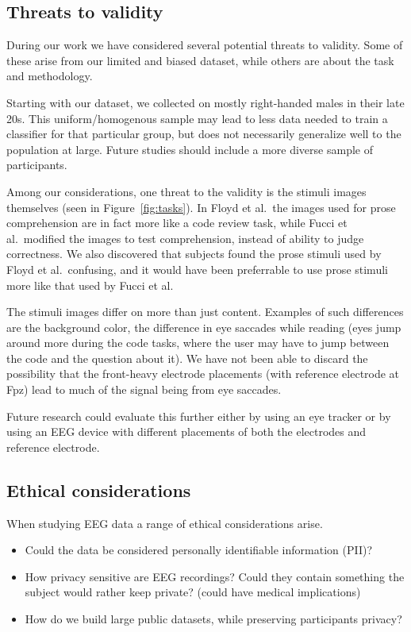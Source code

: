 \subsection{Threats to validity}

    During our work we have considered several potential threats to validity. Some of these arise from our limited and biased dataset, while others are about the task and methodology.

    Starting with our dataset, we collected on mostly right-handed males in their late 20s. This uniform/homogenous sample may lead to less data needed to train a classifier for that particular group, but does not necessarily generalize well to the population at large. Future studies should include a more diverse sample of participants.

    Among our considerations, one threat to the validity is the stimuli images themselves (seen in Figure~\ref{fig:tasks}). In Floyd et al.~the images used for prose comprehension are in fact more like a code review task, while Fucci et al.~modified the images to test comprehension, instead of ability to judge correctness. We also discovered that subjects found the prose stimuli used by Floyd et al.~confusing, and it would have been preferrable to use prose stimuli more like that used by Fucci et al.

    The stimuli images differ on more than just content. Examples of such differences are the background color, the difference in eye saccades while reading (eyes jump around more during the code tasks, where the user may have to jump between the code and the question about it). We have not been able to discard the possibility that the front-heavy electrode placements (with reference electrode at Fpz) lead to much of the signal being from eye saccades. 

    Future research could evaluate this further either by using an eye tracker or by using an EEG device with different placements of both the electrodes and reference electrode.


\subsection{Ethical considerations}

    When studying EEG data a range of ethical considerations arise. 

    \begin{itemize}
        \item Could the data be considered personally identifiable information (PII)? 
        \item How privacy sensitive are EEG recordings? Could they contain something the subject would rather keep private? (could have medical implications)
        \item How do we build large public datasets, while preserving participants privacy?
    \end{itemize}

